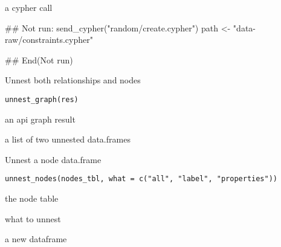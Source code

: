 \documentclass[a4paper]{book}
\begin{document}
%
\begin{Value}
a cypher call
\end{Value}
%
\begin{Examples}
\begin{ExampleCode}
## Not run: 
send_cypher("random/create.cypher")
path <- "data-raw/constraints.cypher"

## End(Not run)
\end{ExampleCode}
\end{Examples}
%
\begin{Description}\relax
Unnest both relationships and nodes
\end{Description}
%
\begin{Usage}
\begin{verbatim}
unnest_graph(res)
\end{verbatim}
\end{Usage}
%
\begin{Arguments}
\begin{ldescription}
\item[\code{res}] an api graph result
\end{ldescription}
\end{Arguments}
%
\begin{Value}
a list of two unnested data.frames
\end{Value}
%
\begin{Description}\relax
Unnest a node data.frame
\end{Description}
%
\begin{Usage}
\begin{verbatim}
unnest_nodes(nodes_tbl, what = c("all", "label", "properties"))
\end{verbatim}
\end{Usage}
%
\begin{Arguments}
\begin{ldescription}
\item[\code{nodes\_tbl}] the node table

\item[\code{what}] what to unnest
\end{ldescription}
\end{Arguments}
%
\begin{Value}
a new dataframe
\end{Value}
\end{document}
